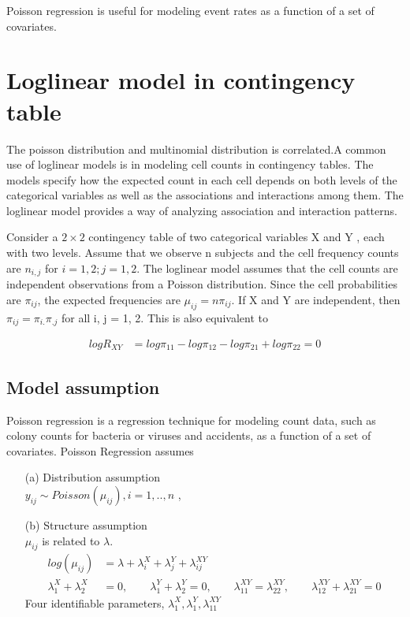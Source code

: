 \documentclass[11pt]{article} %
\begin{document}
Poisson regression is useful for modeling event rates as a function of a set of covariates.

\section{Loglinear model in contingency table}
The poisson distribution and multinomial distribution is correlated.A common use of loglinear models is in modeling cell counts in contingency tables. The models specify how the expected count in each cell depends on both levels of the categorical variables as well as the associations and interactions among them. The loglinear model provides a way of analyzing association and interaction patterns.

Consider a $2 \times 2$ contingency table of two categorical variables X and Y , each with two levels. Assume that we observe n subjects and the cell frequency counts are $n_{i,j}$ for $i = 1, 2; j = 1, 2$. The loglinear model assumes that the cell counts are independent observations from a Poisson distribution. Since the cell probabilities are $\pi_{ij}$, the expected frequencies are ${\mu_{ij} = n \pi_{ij}}$. If X and Y are independent, then $\pi_{ij} = \pi_{i.} \pi_{.j}$ for all i, j = 1, 2. This is also equivalent to

 \begin{align*}
   log R_{XY} &= log \pi_{11} - log \pi_{12} - log \pi_{21} + log \pi_{22} = 0
\end{align*}

\subsection{Model assumption}
Poisson regression is a regression technique for modeling count data, such as colony counts for bacteria or viruses and accidents, as a function of a set of covariates.
Poisson Regression assumes
\begin{itemize}
\item[(a)] Distribution assumption\\
$y_{ij} \sim Poisson(\mu_{ij}), i = 1, .., n$ , 

\item[(b)] Structure assumption\\
$\mu_{ij}$ is related to $\lambda$. 
   \begin{align*}
  log(\mu_{ij}) &= \lambda + \lambda_i^X + \lambda_j^Y + \lambda_{ij}^{XY}\\
\lambda_1^X + \lambda_2^X &= 0, \qquad \lambda_1^Y + \lambda_2^Y = 0, \qquad \lambda_{11}^{XY} = \lambda_{22}^{XY} , \qquad \lambda_{12}^{XY} + \lambda_{21}^{XY} = 0
\end{align*}
Four identifiable parameters, $\lambda_1^X, \lambda_1^Y, \lambda_{11}^{XY}$

\end{itemize}
\end{document}
